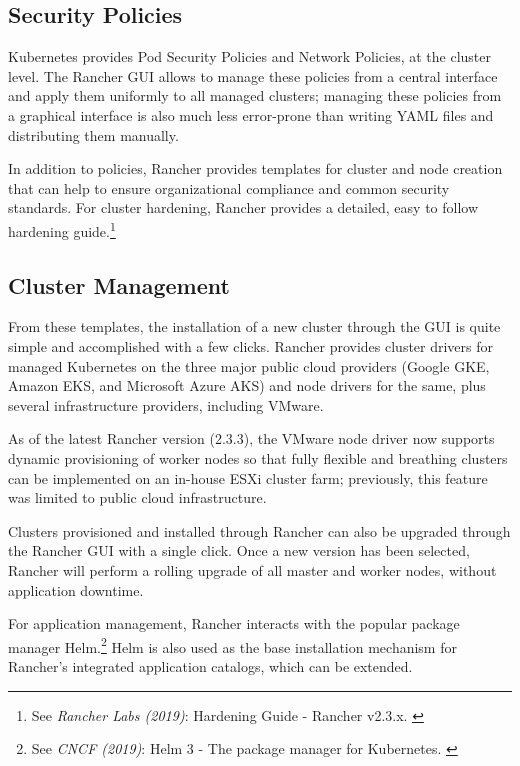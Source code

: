 \subsection{Security Policies}

Kubernetes provides Pod Security Policies and Network Policies, at the cluster level. The Rancher GUI allows to manage these policies from a central interface and apply them uniformly to all managed clusters; managing these policies from a graphical interface is also much less error-prone than writing YAML files and distributing them manually.

In addition to policies, Rancher provides templates for cluster and node creation that can help to ensure organizational compliance and common security standards. For cluster hardening, Rancher provides a detailed, easy to follow hardening guide.\footnote{See \textit{Rancher Labs (2019)}: Hardening Guide - Rancher v2.3.x. \cite{hardeningGuide}}

\subsection{Cluster Management}

From these templates, the installation of a new cluster through the GUI is quite simple and accomplished with a few clicks. Rancher provides cluster drivers for managed Kubernetes on the three major public cloud providers (Google GKE, Amazon EKS, and Microsoft Azure AKS) and node drivers for the same, plus several infrastructure providers, including VMware.

As of the latest Rancher version (2.3.3), the VMware node driver now supports dynamic provisioning of worker nodes so that fully flexible and breathing clusters can be implemented on an in-house ESXi cluster farm; previously, this feature was limited to public cloud infrastructure.

Clusters provisioned and installed through Rancher can also be upgraded through the Rancher GUI with a single click. Once a new version has been selected, Rancher will perform a rolling upgrade of all master and worker nodes, without application downtime.

For application management, Rancher interacts with the popular package manager Helm.\footnote{See \textit{CNCF (2019)}: Helm 3 - The package manager for Kubernetes. \cite{helm}} Helm is also used as the base installation mechanism for Rancher's integrated application catalogs, which can be extended.


